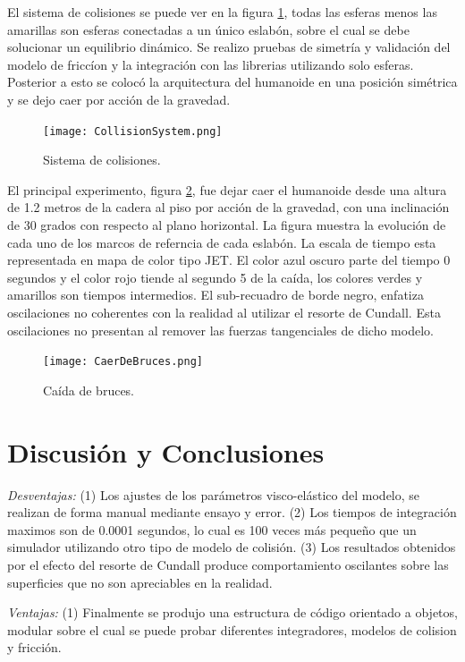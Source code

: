 \documentclass[journal,letterpaper,twoside,twocolumn]{IEEEtran}
\newcommand{\myreferences}{../../../doc/review/review/library}%
\begin{document}
El sistema de colisiones se puede ver en la figura \ref{fig:CollisionModel}, todas las esferas menos las amarillas son esferas conectadas a un único eslabón, sobre el cual se debe solucionar un equilibrio dinámico. Se realizo pruebas de simetría y validación del modelo de friccíon y la integración con las librerias utilizando solo esferas. Posterior a esto se colocó la arquitectura del humanoide en una posición simétrica y se dejo caer por acción de la gravedad. 
\begin{figure}[!h]
  \centering
  \texttt{[image: CollisionSystem.png]}
  \caption{Sistema de colisiones.}
  \label{fig:CollisionModel}
\end{figure}

El principal experimento, figura \ref{fig:Bruces}, fue dejar caer el humanoide desde una altura de 1.2 metros de la cadera al piso por acción de la gravedad, con una inclinación de 30 grados con respecto al plano horizontal. La figura muestra la evolución de cada uno de los marcos de referncia de cada eslabón. La escala de tiempo esta representada en mapa de color tipo JET. El color azul oscuro parte del tiempo 0 segundos y el color rojo tiende al segundo 5 de la caída, los colores verdes y amarillos son tiempos intermedios. El sub-recuadro de borde negro, enfatiza oscilaciones no coherentes con la realidad al utilizar el resorte de Cundall. Esta oscilaciones no presentan al remover las fuerzas tangenciales de dicho modelo. 
\begin{figure}[!h]
  \centering
  \texttt{[image: CaerDeBruces.png]}
  \caption{Caída de bruces.}
  \label{fig:Bruces}
\end{figure}

\section{Discusión y Conclusiones}
\label{sec:conclu}
\emph{Desventajas:} (1) Los ajustes de los parámetros visco-elástico del modelo, se realizan de forma manual mediante ensayo y error. (2) Los tiempos de integración maximos son de 0.0001 segundos, lo cual es 100 veces más pequeño que un simulador utilizando otro tipo de modelo de colisión\cite{Todorov2014}. (3) Los resultados obtenidos por el efecto del resorte de Cundall produce comportamiento oscilantes sobre las superficies que no son apreciables en la realidad.

\emph{Ventajas:} (1) Finalmente se produjo una estructura de código orientado a objetos, modular sobre el cual se puede probar diferentes integradores, modelos de colision y fricción.



\end{document}
